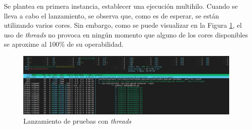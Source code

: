   
  
  
  
  


Se plantea en primera instancia, establecer una ejecución multihilo. Cuando se lleva a cabo el lanzamiento, se observa que, como es de esperar, se están utilizando varios cores. Sin embargo, como se puede visualizar en la Figura \ref{fig:multihilo}, el uso de \textit{threads} no provoca en ningún momento que alguno de los cores disponibles se aproxime al 100\% de su operabilidad.

\vspace{3mm}

\begin{figure}[h!]
  \centering
  \includegraphics[width=1\textwidth]{img/diseno/multihilo.jpg}
  \caption{Lanzamiento de pruebas con \textit{threads}}
  \label{fig:multihilo}
\end{figure}


